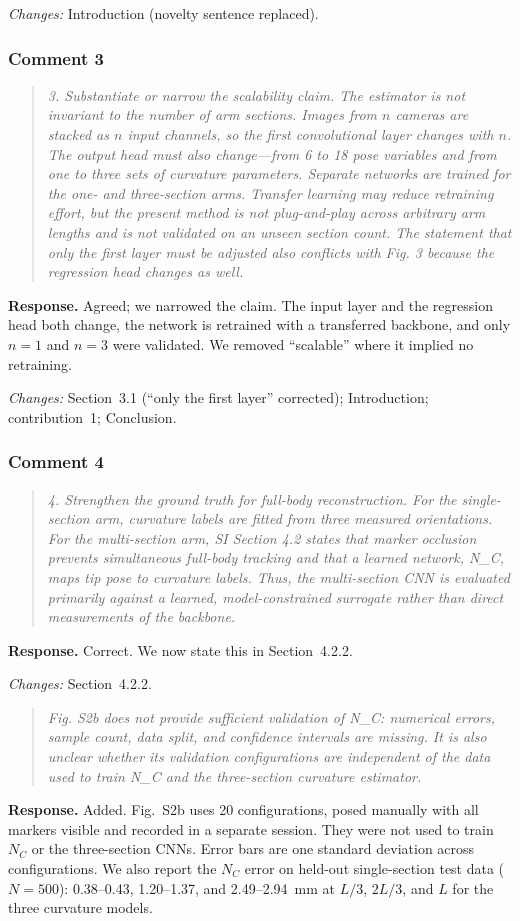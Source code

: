 \documentclass[11pt,a4paper]{article}
\newcommand{\rc}[1]{\begin{quote}\color{black!70}\itshape #1\end{quote}}
\begin{document}
\textit{Changes:} Introduction (novelty sentence replaced).

\subsubsection*{Comment 3}

\rc{3. Substantiate or narrow the scalability claim. The estimator is not invariant to the number of arm sections. Images from $n$ cameras are stacked as $n$ input channels, so the first convolutional layer changes with $n$. The output head must also change---from 6 to 18 pose variables and from one to three sets of curvature parameters. Separate networks are trained for the one- and three-section arms. Transfer learning may reduce retraining effort, but the present method is not plug-and-play across arbitrary arm lengths and is not validated on an unseen section count. The statement that only the first layer must be adjusted also conflicts with Fig. 3 because the regression head changes as well.}
\textbf{Response.} Agreed; we narrowed the claim. The input layer and the regression head both change, the network is retrained with a transferred backbone, and only $n = 1$ and $n = 3$ were validated. We removed ``scalable'' where it implied no retraining.

\textit{Changes:} Section~3.1 (``only the first layer'' corrected); Introduction; contribution~1; Conclusion.

\subsubsection*{Comment 4}

\rc{4. Strengthen the ground truth for full-body reconstruction. For the single-section arm, curvature labels are fitted from three measured orientations. For the multi-section arm, SI Section 4.2 states that marker occlusion prevents simultaneous full-body tracking and that a learned network, N\_C, maps tip pose to curvature labels. Thus, the multi-section CNN is evaluated primarily against a learned, model-constrained surrogate rather than direct measurements of the backbone.}
\textbf{Response.} Correct. We now state this in Section~4.2.2.

\textit{Changes:} Section~4.2.2.

\rc{Fig. S2b does not provide sufficient validation of N\_C: numerical errors, sample count, data split, and confidence intervals are missing. It is also unclear whether its validation configurations are independent of the data used to train N\_C and the three-section curvature estimator.}
\textbf{Response.} Added. Fig.~S2b uses 20 configurations, posed manually with all markers visible and recorded in a separate session. They were not used to train $N_C$ or the three-section CNNs. Error bars are one standard deviation across configurations. We also report the $N_C$ error on held-out single-section test data ($N = 500$): 0.38--0.43, 1.20--1.37, and 2.49--2.94~mm at $L/3$, $2L/3$, and $L$ for the three curvature models.
\end{document}
